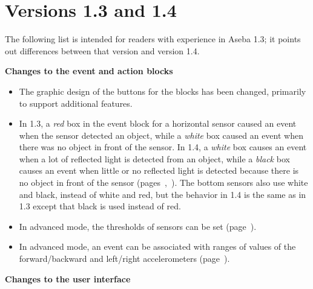 
\chapter*{Versions 1.3 and 1.4}

The following list is intended for readers with experience in Aseba 1.3;
it points out differences between that version and version 1.4.

\textbf{Changes to the event and action blocks}

\begin{itemize}

\item The graphic design of the buttons for the blocks has been changed,
primarily to support additional features.

\item In 1.3, a \emph{red} box in the event block for a horizontal
sensor caused an event when the sensor detected an object, while a
\emph{white} box caused an event when there was no object in front of
the sensor. In 1.4, a \emph{white} box causes an event when a lot of
reflected light is detected from an object, while a \emph{black} box
causes an event when little or no reflected light is detected because
there is no object in front of the sensor
(pages~\pageref{p.proximity-colors1},~\pageref{p.proximity-colors2}).
The bottom sensors also use white and black, instead of white and red,
but the behavior in 1.4 is the same as in 1.3 except that black is used
instead of red.


\item In advanced mode, the thresholds of sensors can be
set (page~\pageref{p.proximity-sensitivity}).

\item In advanced mode, an event can be associated with ranges of values
of the forward/backward and left/right accelerometers
(page~\pageref{p.accel}).


\end{itemize}

\textbf{Changes to the user interface}

